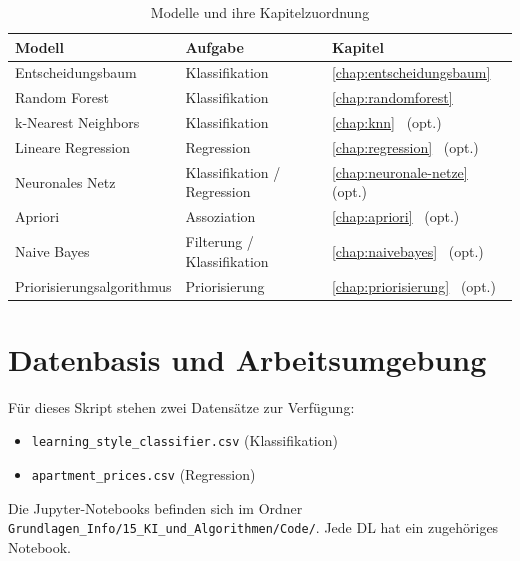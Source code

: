 \begin{table}[H]
\centering
\small
\begin{tabular}{p{3.8cm}p{2.4cm}l}
\toprule
\textbf{Modell} & \textbf{Aufgabe} & \textbf{Kapitel} \\
\midrule
Entscheidungsbaum & Klassifikation & \cref{chap:entscheidungsbaum} \\
Random Forest & Klassifikation & \cref{chap:randomforest} \\
k-Nearest Neighbors & Klassifikation & \cref{chap:knn} \, (opt.) \\
Lineare Regression & Regression & \cref{chap:regression} \, (opt.) \\
Neuronales Netz & Klassifikation / Regression & \cref{chap:neuronale-netze} \, (opt.) \\
Apriori & Assoziation & \cref{chap:apriori} \, (opt.) \\
Naive Bayes & Filterung / Klassifikation & \cref{chap:naivebayes} \, (opt.) \\
Priorisierungsalgorithmus & Priorisierung & \cref{chap:priorisierung} \, (opt.) \\
\bottomrule
\end{tabular}
\caption{Modelle und ihre Kapitelzuordnung}
\label{tab:modelle-uebersicht-15}
\end{table}


\section{Datenbasis und Arbeitsumgebung}

Für dieses Skript stehen zwei Datensätze zur Verfügung:
\begin{itemize}
    \item \texttt{learning\_style\_classifier.csv} (Klassifikation)
    \item \texttt{apartment\_prices.csv} (Regression)
\end{itemize}

Die Jupyter-Notebooks befinden sich im Ordner
\texttt{Grundlagen\_Info/15\_KI\_und\_Algorithmen/Code/}.
Jede DL hat ein zugehöriges Notebook.
